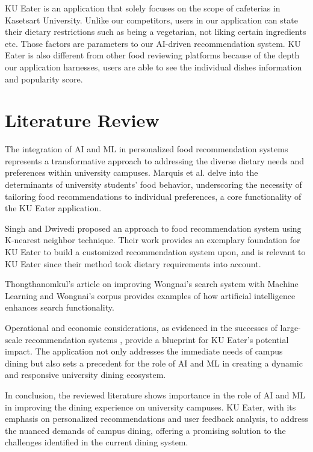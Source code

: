 \par
KU Eater is an application that solely focuses on the scope of cafeterias in Kasetsart University.
Unlike our competitors, users in our application can state their dietary restrictions such as being a vegetarian,
not liking certain ingredients etc. Those factors are parameters to our AI-driven recommendation system.
KU Eater is also different from other food reviewing platforms because of the depth our application harnesses,
users are able to see the individual dishes information and popularity score.

\section{Literature Review}
\label{section:literature-review}

The integration of AI and ML in personalized food recommendation systems represents a transformative approach to addressing
the diverse dietary needs and preferences within university campuses. Marquis et al. \cite{marquisetal:2018}
delve into the determinants of university students' food behavior, underscoring the necessity of tailoring
food recommendations to individual preferences, a core functionality of the KU Eater application.

Singh and Dwivedi \cite{singhanddwivedi:2023} proposed an approach to food recommendation system using K-nearest neighbor technique.
Their work provides an exemplary foundation for KU Eater to build a customized recommendation system upon,
and is relevant to KU Eater since their method took dietary requirements into account.

Thongthanomkul's \cite{thongthanomkul:2020} article on improving Wongnai's search system with Machine Learning
and Wongnai's \cite{wongnaicorpus:github} corpus provides examples of how artificial intelligence enhances search functionality.

Operational and economic considerations, as evidenced in the successes of large-scale recommendation systems \cite{sangwan:2023,netflix:2022},
provide a blueprint for KU Eater's potential impact. The application not only addresses the immediate needs of campus
dining but also sets a precedent for the role of AI and ML in creating a dynamic and responsive university dining ecosystem.

In conclusion, the reviewed literature shows importance in the role of AI and ML in improving the dining experience on university campuses.
KU Eater, with its emphasis on personalized recommendations and user feedback analysis,
to address the nuanced demands of campus dining, offering a promising solution to the challenges identified in the current dining system.